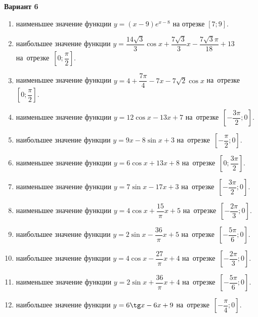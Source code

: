 \documentclass[a4paper,10pt]{article}
\begin{document}
\begin{center}\Large\textbf{Вариант 6}\end{center}

\begin{enumerate}
\item {} наименьшее значение функции $y=\left(x-9\right)e^{x-8}$ на отрезке $\left[7;9\right]$.

\item {} наибольшее значение функции $y=\dfrac{14\sqrt{3}}{3}\cos x+\dfrac{7\sqrt{3}}{3}x-\dfrac{7\sqrt{3}\pi }{18}+13$ на~отрезке~$\left[0;\dfrac{\pi }{2}\right]$.

\item {} наименьшее значение функции $y=4+\dfrac{7\pi }{4}-7x-7\sqrt{2}\cos x$ на~отрезке~$\left[0;\dfrac{\pi }{2}\right]$.

\item {} наименьшее значение функции $y=12\cos x-13x+7$ на~отрезке~$\left[-\dfrac{3\pi }{2};0\right]$.

\item {} наибольшее значение функции $y=9x-8\sin x+3$ на~отрезке~$\left[-\dfrac{\pi }{2};0\right]$.

\item {} наименьшее значение функции $y=6\cos x+13x+8$ на~отрезке~$\left[0;\dfrac{3\pi }{2}\right]$.

\item {} наименьшее значение функции $y=7\sin x-17x+3$ на~отрезке~$\left[-\dfrac{3\pi }{2};0\right]$.

\item {} наименьшее значение функции $y=4\cos x+\dfrac{15}{\pi }x+5$ на~отрезке~$\left[-\dfrac{2\pi }{3};0\right]$.

\item {} наибольшее значение функции $y=2\sin x-\dfrac{36}{\pi }x+5$ на~отрезке~$\left[-\dfrac{5\pi }{6};0\right]$.

\item {} наибольшее значение функции $y=4\cos x-\dfrac{27}{\pi }x+4$ на~отрезке~$\left[-\dfrac{2\pi }{3};0\right]$.

\item {} наименьшее значение функции $y=2\sin x+\dfrac{36}{\pi }x+4$ на~отрезке~$\left[-\dfrac{5\pi }{6};0\right]$.

\item {} наибольшее значение функции $y=6\tg x-6x+9$ на~отрезке~$\left[-\dfrac{\pi }{4};0\right]$.


\end{enumerate}
\end{document}
